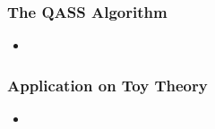 \begin{frame}
	\frametitle{The QASS Algorithm}
	\begin{itemize}
		\item %
	\end{itemize}
\end{frame}

\begin{frame}
	\frametitle{Application on Toy Theory}
	\begin{itemize}
		\item %
	\end{itemize}
\end{frame}

